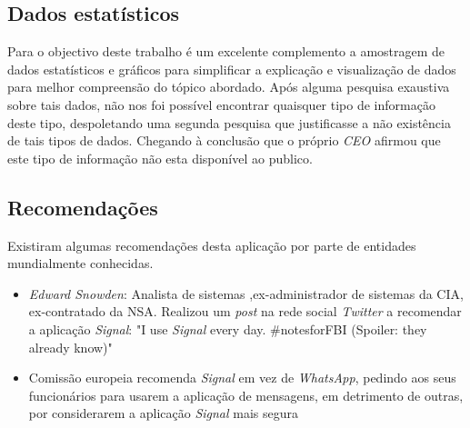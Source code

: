 \subsection{Dados estatísticos}
\label{sec:estatis}
Para o objectivo deste trabalho é um excelente complemento a amostragem de dados estatísticos e gráficos para simplificar a explicação e visualização de dados para melhor compreensão do tópico abordado.
Após alguma pesquisa exaustiva sobre tais dados, não nos foi possível encontrar quaisquer tipo de informação deste tipo, despoletando uma segunda pesquisa que justificasse a não existência de tais tipos de dados. Chegando à conclusão que o próprio \textit{CEO} afirmou que este tipo de informação não esta disponível ao publico.


\subsection{Recomendações}
\label{sec:recomendacoes}
Existiram algumas recomendações desta aplicação por parte de entidades mundialmente conhecidas.
\begin{itemize}
    \item \textit{Edward Snowden}: Analista de sistemas ,ex-administrador de sistemas da CIA, ex-contratado da NSA. Realizou um \textit{post} na rede social \textit{Twitter} a recomendar a aplicação \textit{Signal}: "I use \textit{Signal} every day. \#notesforFBI (Spoiler: they already know)"  \cite{Snowden_tweet}
    \item Comissão europeia recomenda \textit{Signal} em vez de \textit{WhatsApp}, pedindo aos seus funcionários para usarem a aplicação de mensagens, em detrimento de outras, por considerarem a aplicação \textit{Signal} mais segura \cite{publico_new}
\end{itemize}
